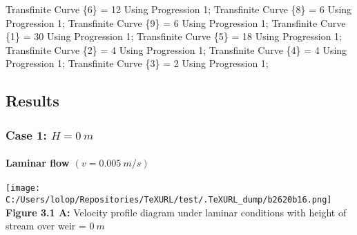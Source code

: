 \documentclass[11pt]{article}
\newenvironment{Shaded}{}{}
\newcommand{\DecValTok}[1]{\textcolor[rgb]{0.25,0.63,0.44}{{#1}}}
\newcommand{\NormalTok}[1]{{#1}}
\newcommand{\OperatorTok}[1]{\textcolor[rgb]{0.40,0.40,0.40}{{#1}}}
\begin{document}
\begin{Shaded}
\begin{Highlighting}[]
\NormalTok{Transfinite Curve }\OperatorTok{\{}\DecValTok{6}\OperatorTok{\}} \OperatorTok{=} \DecValTok{12}\NormalTok{ Using Progression }\DecValTok{1}\OperatorTok{;}
\NormalTok{Transfinite Curve }\OperatorTok{\{}\DecValTok{8}\OperatorTok{\}} \OperatorTok{=} \DecValTok{6}\NormalTok{ Using Progression }\DecValTok{1}\OperatorTok{;}
\NormalTok{Transfinite Curve }\OperatorTok{\{}\DecValTok{9}\OperatorTok{\}} \OperatorTok{=} \DecValTok{6}\NormalTok{ Using Progression }\DecValTok{1}\OperatorTok{;}
\NormalTok{Transfinite Curve }\OperatorTok{\{}\DecValTok{1}\OperatorTok{\}} \OperatorTok{=} \DecValTok{30}\NormalTok{ Using Progression }\DecValTok{1}\OperatorTok{;}
\NormalTok{Transfinite Curve }\OperatorTok{\{}\DecValTok{5}\OperatorTok{\}} \OperatorTok{=} \DecValTok{18}\NormalTok{ Using Progression }\DecValTok{1}\OperatorTok{;}
\NormalTok{Transfinite Curve }\OperatorTok{\{}\DecValTok{2}\OperatorTok{\}} \OperatorTok{=} \DecValTok{4}\NormalTok{ Using Progression }\DecValTok{1}\OperatorTok{;}
\NormalTok{Transfinite Curve }\OperatorTok{\{}\DecValTok{4}\OperatorTok{\}} \OperatorTok{=} \DecValTok{4}\NormalTok{ Using Progression }\DecValTok{1}\OperatorTok{;}
\NormalTok{Transfinite Curve }\OperatorTok{\{}\DecValTok{3}\OperatorTok{\}} \OperatorTok{=} \DecValTok{2}\NormalTok{ Using Progression }\DecValTok{1}\OperatorTok{;}
\end{Highlighting}
\end{Shaded}

\hypertarget{results}{%
\subsection{Results}\label{results}}

\hypertarget{case-1-h-0-m-1}{%
\subsubsection{\texorpdfstring{Case 1:
\(H = 0\ m\)}{Case 1: H = 0\textbackslash{} m}}\label{case-1-h-0-m-1}}

\hypertarget{laminar-flow-v-0.005-ms}{%
\paragraph{\texorpdfstring{Laminar flow
\((v = 0.005\ m/s)\)}{Laminar flow (v = 0.005\textbackslash{} m/s)}}\label{laminar-flow-v-0.005-ms}}

\texttt{[image: C:/Users/lolop/Repositories/TeXURL/test/.TeXURL\_dump/b2620b16.png]} \textbf{Figure 3.1 A:}
Velocity profile diagram under laminar conditions with height of stream
over weir = \(0\ m\)
\end{document}
